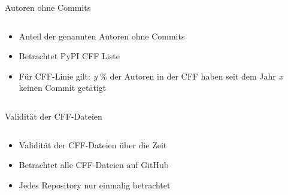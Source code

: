 \documentclass[%
    handout,
    aspectratio=1610,
    10pt,
    onlytextwidth, %
]{beamer}
\begin{document}
\begin{frame}{Autoren ohne Commits}
    \begin{columns}
        \begin{column}[t]{0.29\textwidth}
            \begin{itemize}
                \item Anteil der genannten Autoren ohne Commits
                \item Betrachtet PyPI CFF Liste
                \item Für CFF-Linie gilt: \emph{y} \% der Autoren in der CFF haben seit dem Jahr \emph{x} keinen Commit getätigt
            \end{itemize}
        \end{column}
        \begin{column}[t]{0.69\textwidth}
            \begin{center}
                
            \end{center}
        \end{column}
    \end{columns}
\end{frame}

\begin{frame}{Validität der CFF-Dateien}
    \begin{columns}
        \begin{column}[t]{0.29\textwidth}
            \begin{itemize}
                \item Validität der CFF-Dateien über die Zeit
                \item Betrachtet alle CFF-Dateien auf GitHub
                \item Jedes Repository nur einmalig betrachtet
            \end{itemize}
        \end{column}
        \begin{column}[t]{0.69\textwidth}
            \begin{center}
                
            \end{center}
        \end{column}
    \end{columns}
\end{frame}
\end{document}
